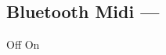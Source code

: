 \subsection[Bluetooth Midi]{Bluetooth Midi --- \UiKey{\SET}}









































Off
On


